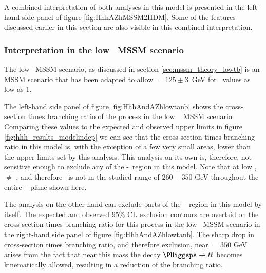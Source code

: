 A combined interpretation of both analyses in this model is presented
in the left-hand side panel of figure \ref{fig:HhhAZhMSSM2HDM}. Some of the features discussed earlier
in this section are also visible in this combined interpretation.


\subsubsection{Interpretation in the low \tanb~MSSM scenario}
\label{sec:hhh_results_modeldep_lowtb}
The low \tanb~MSSM scenario, as discussed in section \ref{sec:mssm_theory_lowtb}
is an MSSM scenario that has been adapted to allow \mh $=125 \pm 3$~GeV for \tanb~values
as low as 1.  

The left-hand side panel of figure \ref{fig:HhhAndAZhlowtanb} shows the cross-section times branching ratio
of the \Htohhtobbtautau process in the low \tanb~ MSSM scenario. Comparing these values 
to the expected and observed upper limits in figure \ref{fig:hhh_results_modelindep} we 
can see that the cross-section times branching ratio in this model is, with the exception of a few very small 
areas, lower than the upper limits set by this analysis. This analysis on its own is,
therefore, not sensitive enough to exclude any of the \mA-\tanb~region in this model. Note that
at low \tanb, \mA$\neq$ \mH, and therefore \mH~is not in the studied range of $260-350$ GeV
throughout the entire \mA-\tanb~plane shown here.

The \AtoZhtolltautau analysis on the other hand can exclude parts of the \mA-\tanb~region
in this model by itself. The expected and observed 95\% CL exclusion contours are overlaid 
on the cross-section times branching ratio for this process in the low \tanb~MSSM scenario in the right-hand side panel 
of figure \ref{fig:HhhAndAZhlowtanb}. The sharp drop in cross-section times branching ratio, and therefore exclusion,
near \mA $ = 350$ GeV arises from the fact that near this mass the decay $\PHiggsps \rightarrow t\bar{t}$ becomes
kinematically allowed, resulting in a reduction of the \AtoZh branching ratio.


